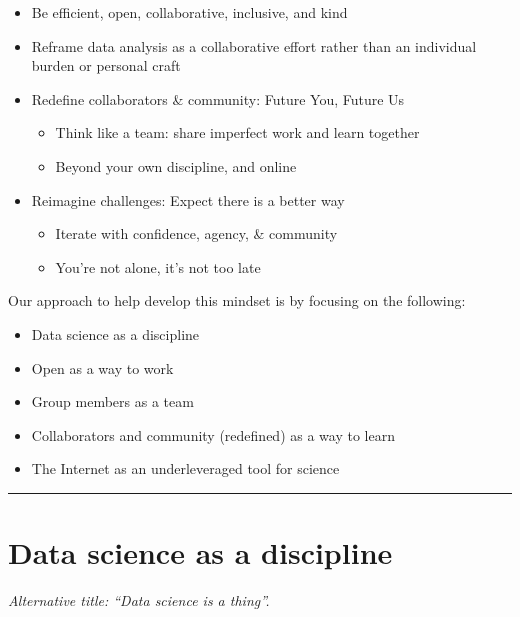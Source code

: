 \documentclass[
  letterpaper,
  DIV=11,
  numbers=noendperiod]{scrreprt}
\providecommand{\tightlist}{%
  \setlength{\itemsep}{0pt}\setlength{\parskip}{0pt}}
\begin{document}
\begin{itemize}
\tightlist
\item
  Be efficient, open, collaborative, inclusive, and kind
\item
  Reframe data analysis as a collaborative effort rather than an
  individual burden or personal craft
\item
  Redefine collaborators \& community: Future You, Future Us

  \begin{itemize}
  \tightlist
  \item
    Think like a team: share imperfect work and learn together
  \item
    Beyond your own discipline, and online
  \end{itemize}
\item
  Reimagine challenges: Expect there is a better way

  \begin{itemize}
  \tightlist
  \item
    Iterate with confidence, agency, \& community
  \item
    You're not alone, it's not too late
  \end{itemize}
\end{itemize}

Our approach to help develop this mindset is by focusing on the
following:

\begin{itemize}
\tightlist
\item
  Data science as a discipline
\item
  Open as a way to work
\item
  Group members as a team
\item
  Collaborators and community (redefined) as a way to learn
\item
  The Internet as an underleveraged tool for science
\end{itemize}

\begin{center}\rule{0.5\linewidth}{0.5pt}\end{center}

\hypertarget{data-science-as-a-discipline}{%
\section{Data science as a
discipline}\label{data-science-as-a-discipline}}

\emph{Alternative title: ``Data science is a thing''.}
\end{document}
